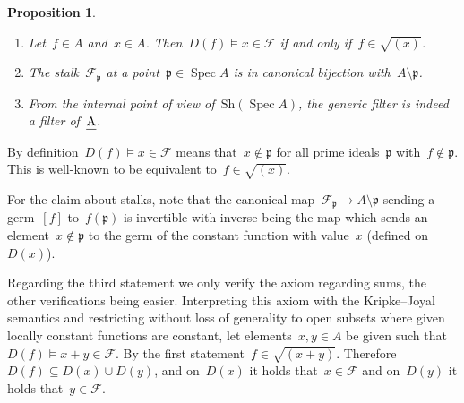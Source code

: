 \documentclass[10pt,reqno,a4paper]{amsbook}
\makeatletter
\theoremstyle{definition}
\theoremstyle{plain}
\newtheorem{prop}[defn]{Proposition}
\theoremstyle{remark}
\newcommand{\F}{\mathcal{F}}
\newcommand{\ppp}{\mathfrak{p}}
\let\oldul\ul
\renewcommand{\ul}[1]{\text{\oldul{$#1$}}}
\newcommand{\Sh}{\mathrm{Sh}}
\DeclareMathOperator{\Spec}{Spec}
\newcommand{\?}{\,{:}\,}
\renewcommand{\_}{\mathpunct{.}\,}
\renewenvironment{proof}[1][\proofname]{\par
  \pushQED{\qed}%
  \normalfont \topsep6\p@\@plus6\p@\relax
  \trivlist
  \item[\hskip\labelsep
        \itshape
    #1\@addpunct{.}]\ignorespaces
}{%
  \popQED\endtrivlist\@endpefalse
}
\makeatother
\begin{document}
\begin{prop}\label{prop:basics-univ-filter}\ \begin{enumerate}
\item Let~$f \in A$ and~$x \in A$. Then~$D(f) \models x \in \F$ if and only
if~$f \in \sqrt{(x)}$.
\item The stalk~$\F_\ppp$ at a point~$\ppp \in \Spec A$
is in canonical bijection with~$A \setminus \ppp$.
\item From the internal point of view of~$\Sh(\Spec A)$, the generic
filter is indeed a filter of~$\ul{A}$.
\end{enumerate}
\end{prop}
\begin{proof}By definition~$D(f) \models x \in \F$ means that~$x \not\in \ppp$
for all prime ideals~$\ppp$ with~$f \not\in \ppp$. This is well-known to be
equivalent to~$f \in \sqrt{(x)}$.

For the claim about stalks, note that the canonical map~$\F_\ppp \to A
\setminus \ppp$ sending a germ~$[f]$ to~$f(\ppp)$ is invertible with inverse
being the map which sends an element~$x \not\in \ppp$ to the germ of the
constant function with value~$x$ (defined on~$D(x)$).

Regarding the third statement we only verify the axiom regarding sums, the
other verifications being easier. Interpreting this axiom with the Kripke--Joyal
semantics and restricting without loss of generality to open subsets where
given locally constant functions are constant, let elements~$x,y \in A$ be
given such that~$D(f) \models x+y \in \F$. By the first statement~$f \in
\sqrt{(x+y)}$. Therefore~$D(f) \subseteq D(x) \cup D(y)$, and on~$D(x)$ it
holds that~$x \in \F$ and on~$D(y)$ it holds that~$y \in \F$.
\end{proof}
\end{document}
